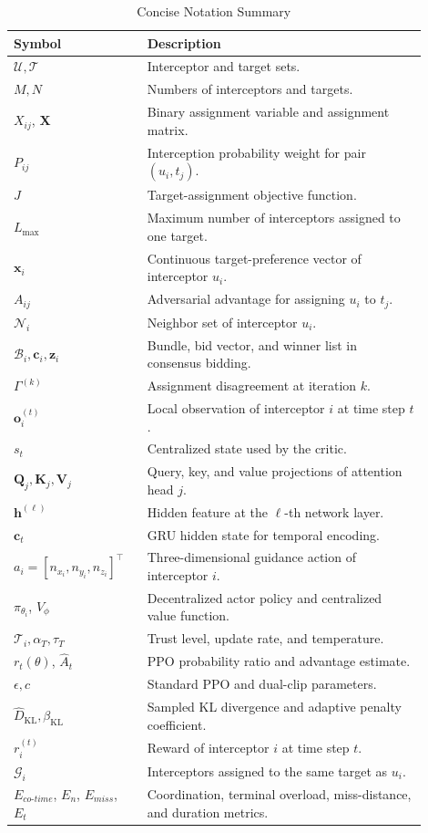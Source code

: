 \documentclass[lettersize,journal]{IEEEtran}
\begin{document}
\begin{table}[!t]
\centering
\caption{Concise Notation Summary}
\label{tab:notation}
\renewcommand{\arraystretch}{1.15}
\footnotesize
\begin{tabular}{p{0.28\linewidth}p{0.62\linewidth}}
\toprule
Symbol & Description \\
\midrule
$\mathcal{U},\mathcal{T}$ & Interceptor and target sets. \\
$M,N$ & Numbers of interceptors and targets. \\
$X_{ij}$, $\mathbf{X}$ & Binary assignment variable and assignment matrix. \\
$P_{ij}$ & Interception probability weight for pair $(u_i,t_j)$. \\
$J$ & Target-assignment objective function. \\
$L_{\max}$ & Maximum number of interceptors assigned to one target. \\
$\mathbf{x}_i$ & Continuous target-preference vector of interceptor $u_i$. \\
$A_{ij}$ & Adversarial advantage for assigning $u_i$ to $t_j$. \\
$\mathcal{N}_i$ & Neighbor set of interceptor $u_i$. \\
$\mathcal{B}_i,\mathbf{c}_i,\mathbf{z}_i$ & Bundle, bid vector, and winner list in consensus bidding. \\
$\Gamma^{(k)}$ & Assignment disagreement at iteration $k$. \\
$\mathbf{o}_i^{(t)}$ & Local observation of interceptor $i$ at time step $t$. \\
$s_t$ & Centralized state used by the critic. \\
$\mathbf Q_j,\mathbf K_j,\mathbf V_j$ & Query, key, and value projections of attention head \(j\). \\
$\mathbf{h}^{(\ell)}$ & Hidden feature at the $\ell$-th network layer. \\
$\mathbf{c}_t$ & GRU hidden state for temporal encoding. \\
$a_i=[n_{x_i},n_{y_i},n_{z_i}]^\top$ & Three-dimensional guidance action of interceptor $i$. \\
$\pi_{\theta_i}$, $V_{\phi}$ & Decentralized actor policy and centralized value function. \\
$\mathcal{T}_i,\alpha_T,\tau_T$ & Trust level, update rate, and temperature. \\
$r_t(\theta)$, $\hat{A}_t$ & PPO probability ratio and advantage estimate. \\
$\epsilon,c$ & Standard PPO and dual-clip parameters. \\
$\hat D_{\mathrm{KL}},\beta_{\mathrm{KL}}$ & Sampled KL divergence and adaptive penalty coefficient. \\
$r_i^{(t)}$ & Reward of interceptor $i$ at time step $t$. \\
$\mathcal{G}_i$ & Interceptors assigned to the same target as $u_i$. \\
$E_{co\text{-}time}$, $E_n$, $E_{miss}$, $E_t$ & Coordination, terminal overload, miss-distance, and duration metrics. \\
\bottomrule
\end{tabular}
\end{table}
\end{document}
